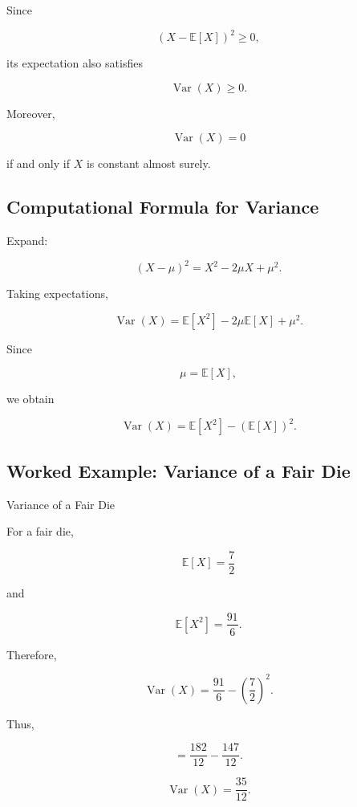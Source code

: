 Since

\[
(X-\mathbb{E}[X])^2
\geq0,
\]

its expectation also satisfies

\[
\boxed{
\operatorname{Var}(X)\geq0.
}
\]

Moreover,

\[
\operatorname{Var}(X)=0
\]

if and only if \(X\) is constant almost surely.

\subsection{Computational Formula for Variance}
\label{subsec:variance-computational-formula}

Expand:

\[
(X-\mu)^2
=
X^2-2\mu X+\mu^2.
\]

Taking expectations,

\[
\operatorname{Var}(X)
=
\mathbb{E}[X^2]
-
2\mu\mathbb{E}[X]
+
\mu^2.
\]

Since

\[
\mu=\mathbb{E}[X],
\]

we obtain

\[
\boxed{
\operatorname{Var}(X)
=
\mathbb{E}[X^2]
-
(\mathbb{E}[X])^2.
}
\]

\subsection{Worked Example: Variance of a Fair Die}
\label{subsec:worked-die-variance}

\begin{workedexamplebox}{Variance of a Fair Die}

For a fair die,

\[
\mathbb{E}[X]
=
\frac72
\]

and

\[
\mathbb{E}[X^2]
=
\frac{91}{6}.
\]

Therefore,

\[
\operatorname{Var}(X)
=
\frac{91}{6}
-
\left(
\frac72
\right)^2.
\]

Thus,

\[
=
\frac{182}{12}
-
\frac{147}{12}.
\]

\begin{answerbox}
\[
\boxed{
\operatorname{Var}(X)
=
\frac{35}{12}.
}
\]
\end{answerbox}

\end{workedexamplebox}

